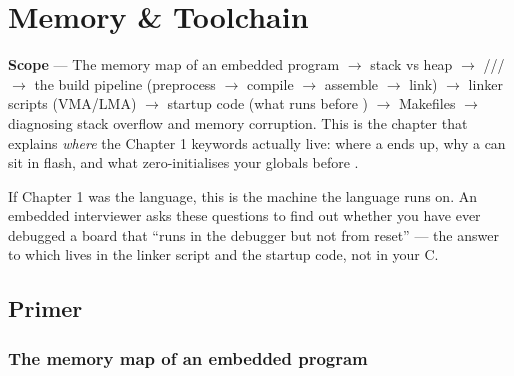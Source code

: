 
\chapter{Memory \& Toolchain}
\label{ch:memory-toolchain}

\begin{partnote}
\textbf{Scope} --- The memory map of an embedded program $\rightarrow$ stack
vs heap $\rightarrow$ ///
$\rightarrow$ the build pipeline (preprocess $\rightarrow$ compile $\rightarrow$
assemble $\rightarrow$ link) $\rightarrow$ linker scripts (VMA/LMA)
$\rightarrow$ startup code (what runs before ) $\rightarrow$
Makefiles $\rightarrow$ diagnosing stack overflow and memory corruption.
This is the chapter that explains \emph{where} the Chapter 1 keywords
actually live: where a  ends up, why a  can sit in
flash, and what zero-initialises your globals before .
\end{partnote}

If Chapter 1 was the language, this is the machine the language runs on. An
embedded interviewer asks these questions to find out whether you have ever
debugged a board that ``runs in the debugger but not from reset'' --- the
answer to which lives in the linker script and the startup code, not in your C.

\section{Primer}

\subsection{The memory map of an embedded program}

